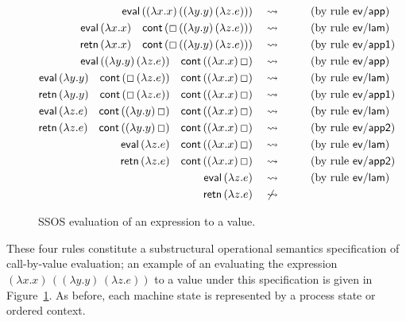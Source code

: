 \begin{figure}
\begin{align*}
{\sf eval}\,((\lambda x.x)\,((\lambda y.y)\,(\lambda z.e))) 
& ~~~\rightsquigarrow~~ \tag{by rule ${\sf ev/app}$}\\
{\sf eval}\,(\lambda x.x) \quad
{\sf cont}\,(\Box\,((\lambda y.y)\,(\lambda z.e)))
& ~~~\rightsquigarrow~~ \tag{by rule ${\sf ev/lam}$}\\
{\sf retn}\,(\lambda x.x) \quad
{\sf cont}\,(\Box\,((\lambda y.y)\,(\lambda z.e)))
& ~~~\rightsquigarrow~~ \tag{by rule ${\sf ev/app1}$}\\
{\sf eval}\,((\lambda y.y)\,(\lambda z.e)) \quad
{\sf cont}\,((\lambda x.x)\,\Box)
& ~~~\rightsquigarrow~~ \tag{by rule ${\sf ev/app}$}\\
{\sf eval}\,(\lambda y.y) \quad
{\sf cont}\,(\Box\,(\lambda z.e)) \quad
{\sf cont}\,((\lambda x.x)\,\Box)
& ~~~\rightsquigarrow~~ \tag{by rule ${\sf ev/lam}$}\\
{\sf retn}\,(\lambda y.y) \quad
{\sf cont}\,(\Box\,(\lambda z.e)) \quad
{\sf cont}\,((\lambda x.x)\,\Box)
& ~~~\rightsquigarrow~~ \tag{by rule ${\sf ev/app1}$}\\
{\sf eval}\,(\lambda z.e) \quad
{\sf cont}\,((\lambda y.y)\,\Box) \quad
{\sf cont}\,((\lambda x.x)\,\Box)
& ~~~\rightsquigarrow~~ \tag{by rule ${\sf ev/lam}$}\\
{\sf retn}\,(\lambda z.e) \quad
{\sf cont}\,((\lambda y.y)\,\Box) \quad
{\sf cont}\,((\lambda x.x)\,\Box)
& ~~~\rightsquigarrow~~ \tag{by rule ${\sf ev/app2}$}\\
{\sf eval}\,(\lambda z.e) \quad
{\sf cont}\,((\lambda x.x)\,\Box)
& ~~~\rightsquigarrow~~ \tag{by rule ${\sf ev/lam}$}\\
{\sf retn}\,(\lambda z.e) \quad
{\sf cont}\,((\lambda x.x)\,\Box)
& ~~~\rightsquigarrow~~ \tag{by rule ${\sf ev/app2}$}\\
{\sf eval}\,(\lambda z.e) 
& ~~~\rightsquigarrow~~ \tag{by rule ${\sf ev/lam}$}\\
{\sf retn}\,(\lambda z.e) 
& ~~~\not\rightsquigarrow~~ 
\end{align*}
\caption{SSOS evaluation of an expression to a value.}
\label{fig:ssos-example}
\end{figure}

These four rules constitute a substructural operational semantics
specification of call-by-value evaluation; an example of an evaluating
the expression $(\lambda x.x)\,((\lambda y.y)\,(\lambda z.e))$ to a
value under this specification is given in Figure~\ref{fig:ssos-example}. 
As before, each machine state is represented by a process state or
ordered context.

